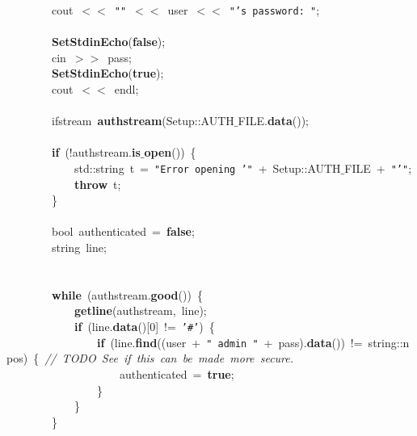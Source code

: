 \mbox{}\ \ \ \ \ \ \ \ cout\ $<$$<$\ \texttt{"{}"{}}\ $<$$<$\ user\ $<$$<$\ \texttt{"{}'s\ password:\ "{}}; \\
\mbox{} \\
\mbox{}\ \ \ \ \ \ \ \ \textbf{SetStdinEcho}(\textbf{false}); \\
\mbox{}\ \ \ \ \ \ \ \ cin\ $>$$>$\ pass; \\
\mbox{}\ \ \ \ \ \ \ \ \textbf{SetStdinEcho}(\textbf{true}); \\
\mbox{}\ \ \ \ \ \ \ \ cout\ $<$$<$\ endl; \\
\mbox{}\ \ \ \ \ \ \ \  \\
\mbox{}\ \ \ \ \ \ \ \ ifstream\ \textbf{authstream}(Setup::AUTH$\_$FILE.\textbf{data}()); \\
\mbox{} \\
\mbox{}\ \ \ \ \ \ \ \ \textbf{if}\ (!authstream.\textbf{is$\_$open}())\ \{ \\
\mbox{}\ \ \ \ \ \ \ \ \ \ \ \ std::string\ t\ =\ \texttt{"{}Error\ opening\ '"{}}\ +\ Setup::AUTH$\_$FILE\ +\ \texttt{"{}'"{}}; \\
\mbox{}\ \ \ \ \ \ \ \ \ \ \ \ \textbf{throw}\ t; \\
\mbox{}\ \ \ \ \ \ \ \ \} \\
\mbox{} \\
\mbox{}\ \ \ \ \ \ \ \ bool\ authenticated\ =\ \textbf{false}; \\
\mbox{}\ \ \ \ \ \ \ \ string\ line; \\
\mbox{} \\
\mbox{} \\
\mbox{}\ \ \ \ \ \ \ \ \textbf{while}\ (authstream.\textbf{good}())\ \{ \\
\mbox{}\ \ \ \ \ \ \ \ \ \ \ \ \textbf{getline}(authstream,\ line); \\
\mbox{}\ \ \ \ \ \ \ \ \ \ \ \ \textbf{if}\ (line.\textbf{data}()[0]\ !=\ \texttt{'\#'})\ \{ \\
\mbox{}\ \ \ \ \ \ \ \ \ \ \ \ \ \ \ \ \textbf{if}\ (line.\textbf{find}((user\ +\ \texttt{"{}\ admin\ "{}}\ +\ pass).\textbf{data}())\ !=\ string::npos)\ \{\ \textit{//\ TODO\ See\ if\ this\ can\ be\ made\ more\ secure.} \\
\mbox{}\ \ \ \ \ \ \ \ \ \ \ \ \ \ \ \ \ \ \ \ authenticated\ =\ \textbf{true}; \\
\mbox{}\ \ \ \ \ \ \ \ \ \ \ \ \ \ \ \ \} \\
\mbox{}\ \ \ \ \ \ \ \ \ \ \ \ \} \\
\mbox{}\ \ \ \ \ \ \ \ \} \\
$$
